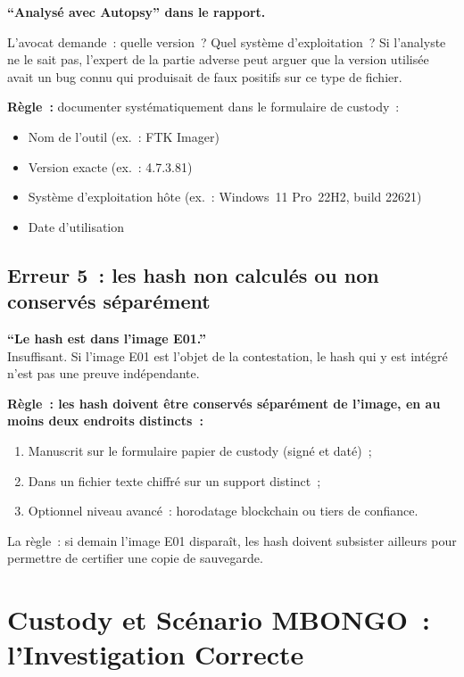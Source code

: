 \begin{boxalert}
\textbf{``Analysé avec Autopsy'' dans le rapport.}

L'avocat demande~: quelle version~? Quel système d'exploitation~? Si
l'analyste ne le sait pas, l'expert de la partie adverse peut arguer que
la version utilisée avait un bug connu qui produisait de faux positifs sur
ce type de fichier.

\textbf{Règle~:} documenter systématiquement dans le formulaire de custody~:
\begin{itemize}
    \item Nom de l'outil (ex.~: FTK Imager)
    \item Version exacte (ex.~: 4.7.3.81)
    \item Système d'exploitation hôte (ex.~: Windows~11 Pro~22H2, build 22621)
    \item Date d'utilisation
\end{itemize}
\end{boxalert}

\subsection{Erreur 5~: les hash non calculés ou non conservés séparément}

\begin{boxalert}
\textbf{``Le hash est dans l'image E01.''}\\
Insuffisant. Si l'image E01 est l'objet de la contestation, le hash qui y
est intégré n'est pas une preuve indépendante.

\textbf{Règle~: les hash doivent être conservés séparément de l'image,
en au moins deux endroits distincts~:}
\begin{enumerate}
    \item Manuscrit sur le formulaire papier de custody (signé et daté)~;
    \item Dans un fichier texte chiffré sur un support distinct~;
    \item Optionnel niveau avancé~: horodatage blockchain ou tiers de confiance.
\end{enumerate}
La règle~: si demain l'image E01 disparaît, les hash doivent subsister
ailleurs pour permettre de certifier une copie de sauvegarde.
\end{boxalert}

\section{Custody et Scénario MBONGO~: l'Investigation Correcte}
\label{sec:custody-mbongo}

